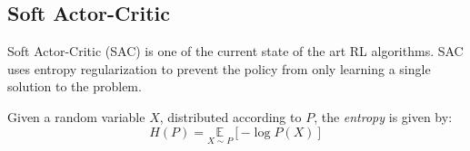 \subsection{Soft Actor-Critic}
\label{sec:preliminaries:rl:sac}

Soft Actor-Critic (SAC) \cite{haarnojaOffPolicyMaximumEntropy} is one of the current state of the art RL algorithms. SAC uses entropy regularization to prevent the policy from only learning a single solution to the problem.
\begin{definition}
    Given a random variable $X$, distributed according to $P$, the \emph{entropy} is given by:
    \begin{equation}
        H(P) = \underset{X\sim P}{\mathbb{E}}[-\log P(X)]
    \end{equation}
\end{definition}


